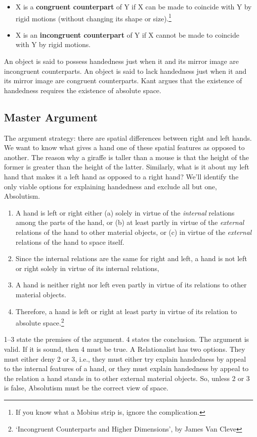 \documentclass[oneside]{article}
\begin{document}
\begin{itemize}

\item
  X is a \textbf{congruent counterpart} of Y if X can be made to
  coincide with Y by rigid motions (without changing its shape or
  size).\footnote{If you know what a Mobius strip is, ignore the
    complication.}
\item
  X is an \textbf{incongruent counterpart} of Y if X cannot be made to
  coincide with Y by rigid motions.
\end{itemize}
An object is said to possess handedness just when it and its mirror
image are incongruent counterparts. An object is said to lack handedness just when it and its mirror image are congruent counterparts. Kant argues that the existence of handedness requires the existence of absolute space.

\subsection*{Master Argument}\label{master-argument}

The argument strategy: there are spatial differences between right and
left hands. We want to know what gives a hand one of these spatial
features as opposed to another. The reason why a giraffe is taller than
a mouse is that the height of the former is greater than the height of
the latter. Similarly, what is it about my left hand that makes it a
left hand as opposed to a right hand? We'll identify the only viable
options for explaining handedness and exclude all but one, Absolutism.

\begin{enumerate}

\item
  A hand is left or right either (a) solely in virtue of the
  \emph{internal} relations among the parts of the hand, or (b) at least
  partly in virtue of the \emph{external} relations of the hand to other
  material objects, or (c) in virtue of the \emph{external} relations of
  the hand to space itself.
\item
  Since the internal relations are the same for right and left, a hand
  is not left or right solely in virtue of its internal relations,
\item
  A hand is neither right nor left even partly in virtue of its
  relations to other material objects.
\item
  Therefore, a hand is left or right at least party in virtue of its
  relation to absolute space.\footnote{`Incongruent Counterparts and
    Higher Dimensions', by James Van Cleve}
\end{enumerate}
1--3 state the premises of the argument. 4 states the conclusion. The
argument is valid. If it is sound, then 4 must be true. A Relationalist has two options. They must either deny 2 or 3, i.e., they must either try explain handedness by appeal to the internal features of a hand, or they must explain handedness by appeal to the relation a hand stands in to other external material objects. So, unless 2 or 3 is false, Absolutism must be the correct view of space. 
\end{document}
